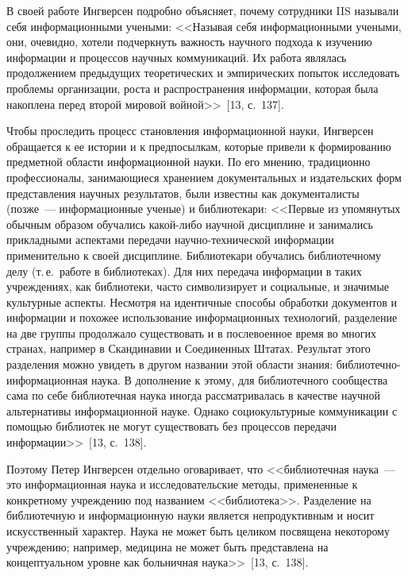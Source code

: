 \begin{multicols}{2}
      В своей работе Ингверсен подробно объяс\-няет, почему сотрудники IIS
называли себя информационными учеными: <<Называя себя
информационными учеными, они, очевидно, хотели подчеркнуть важность научного подхода к
изучению информации и процессов научных коммуникаций. Их работа являлась продолжением
предыдущих теоретических и эмпирических попыток исследовать проблемы организации,
роста и распространения информации, которая была накоплена перед второй мировой
войной>>~[13, с.~137].

      Чтобы проследить процесс становления информационной науки, Ингверсен обращается
к ее истории и к предпосылкам, которые привели к формированию предметной области
информационной науки. По его мнению, традиционно профессионалы, занимающиеся
хранением документальных и издательских форм представления научных результатов, были
известны как документалисты (позже~--- информационные ученые) и библиотекари: <<Первые
из упомянутых обычным образом обуча\-лись какой-либо научной дисциплине и занимались
прикладными аспектами передачи на\-уч\-но-тех\-ни\-че\-ской информации применительно к своей
дисциплине. Библиотекари обучались библиотечному делу (т.\,е.\ работе в библиотеках). Для
них передача информации в таких учреждениях, как библиотеки, часто символизирует и
социальные, и значимые культурные аспекты. Несмотря на идентичные способы обработки
документов и информации и похожее использование информационных технологий, разделение
на две группы продолжало существовать и в послевоенное время во многих странах, например
в Скандинавии и Соединенных Штатах. Результат этого разделения можно увидеть в другом
названии этой области знания: библиотечно-информационная наука. В дополнение к этому, для
библиотечного сообщества сама по себе библиотечная наука иногда рассматривалась в качестве
научной альтернативы информационной науке. Однако социокультурные коммуникации с
помощью библиотек не могут существовать без процессов передачи
информации>>~[13, с.~138].

      Поэтому Петер Ингверсен отдельно оговаривает, что <<библиотечная наука~--- это
информационная наука и исследовательские методы, примененные к конкретному учреждению
под названием <<библиотека>>. Разделение на библиотечную и информационную науки
является непродуктивным и носит искусственный характер. Наука не может быть целиком
посвящена некоторому учреждению; например, медицина не может быть представлена на
концептуальном уровне как больничная наука>>~[13, с.~138].


\end{multicols}
